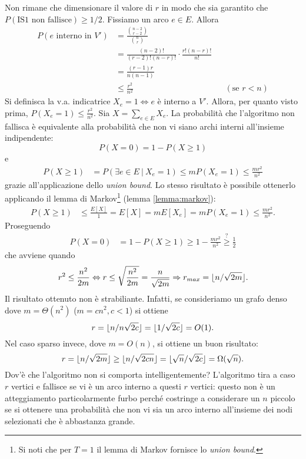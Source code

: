 Non rimane che dimensionare il valore di $r$ in modo che sia garantito che $P(\text{IS1 non fallisce})\geq 1/2$. Fissiamo un arco $e\in E$. Allora
\begin{align*}
P(e \text{ interno in } V')&=\frac{\binom{n-2}{r-2}}{\binom{n}{r}} \\
&=\frac{(n-2)!}{(r-2)!(n-r)!}\cdot\frac{r!(n-r)!}{n!} \\
&=\frac{(r-1)r}{n(n-1)} \\
&\leq\frac{r^2}{n^2} && (\text{se } r<n)
\end{align*}
Si definisca la v.a. indicatrice $X_e=1 \Leftrightarrow e$ è interno a $V'$. Allora, per quanto visto prima, $P(X_e=1)\leq\frac{r^2}{n^2}$. Sia $X=\sum_{e\in E}X_e$. La probabilità che l'algoritmo non fallisca è equivalente alla probabilità che non vi siano archi interni all'insieme indipendente:
\[
P(X=0)=1-P(X\geq 1)
\]
e
\begin{align*}
P(X\geq 1)&=P(\exists e\in E\ |\ X_e=1) \leq mP(X_e=1) \leq \frac{mr^2}{n^2}
\end{align*}
grazie all'applicazione dello \textit{union bound}.
Lo stesso risultato è possibile ottenerlo applicando il lemma di Markov\footnote{Si noti che per $T=1$ il lemma di Markov fornisce lo \textit{union bound}.} (lemma \ref{lemma:markov}):
\begin{align*}
P(X\geq 1)&\leq \frac{E[X]}{1}=E[X]=mE[X_e]=mP(X_e=1)\leq\frac{mr^2}{n^2}.
\end{align*}
Proseguendo
\begin{align*}
P(X=0)&=1-P(X\geq 1) \geq 1-\frac{mr^2}{n^2} \overset{?}{\geq} \frac{1}{2}
\end{align*}
che avviene quando
\begin{align*}
r^2\leq \frac{n^2}{2m} \Leftrightarrow r\leq\sqrt{\frac{n^2}{2m}}=\frac{n}{\sqrt{2m}} \Rightarrow r_{max}=\lfloor n/\sqrt{2m}\rfloor.
\end{align*}
Il risultato ottenuto non è strabiliante. Infatti, se consideriamo un grafo denso dove $m=\Theta(n^2)$ ($m=cn^2, c<1$) si ottiene
\[
r=\lfloor n/n\sqrt{2c}\rfloor=\lfloor1/\sqrt{2c}\rfloor=O(1).
\]
Nel caso sparso invece, dove $m=O(n)$, si ottiene un buon risultato:
\[
r=\lfloor n/\sqrt{2m}\rfloor\geq\lfloor n/\sqrt{2cn}\rfloor=\lfloor\sqrt{n}/\sqrt{2c}\rfloor=\Omega(\sqrt{n}).
\]
Dov'è che l'algoritmo non si comporta intelligentemente? L'algoritmo tira a caso $r$ vertici e fallisce se vi è un arco interno a questi $r$ vertici: questo non è un atteggiamento particolarmente furbo perché costringe a considerare un $n$ piccolo se si ottenere una probabilità che non vi sia un arco interno all'insieme dei nodi selezionati che è abbastanza grande.

